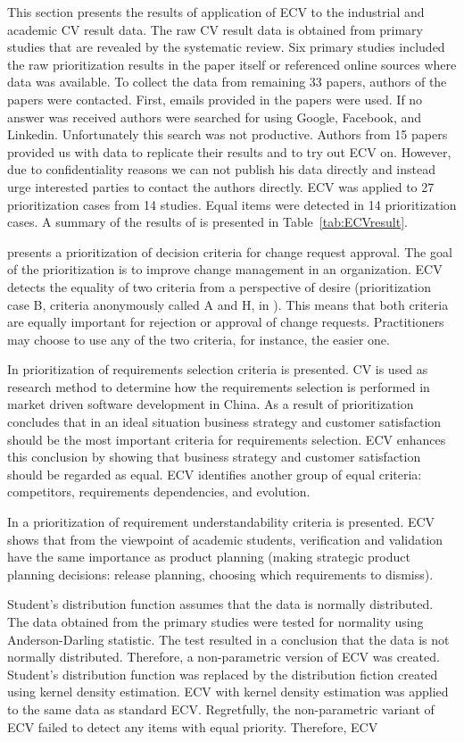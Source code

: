 This section presents the results of application of ECV to the industrial
and academic CV result data. The raw CV result data is obtained from
primary studies that are revealed by the systematic review. Six primary
studies included the raw prioritization results in the paper itself
or referenced online sources where data was available. To collect
the data from remaining 33 papers, authors of the papers were contacted.
First, emails provided in the papers were used. If no answer was received authors
were searched for using Google, Facebook, and Linkedin. Unfortunately
this search was not productive. Authors from 15 papers provided us with data to replicate their results and to try out ECV on.
However, due to confidentiality reasons we can not publish his data directly and instead urge interested parties to contact the authors directly.
ECV was applied to 27 prioritization cases from 14 studies.
Equal items were detected in 14 prioritization cases.
A summary of the results of is presented in Table~\ref{tab:ECVresult}.

\citep{Berander2006a} presents a prioritization of decision criteria
for change request approval. The goal of the prioritization is to
improve change management in an organization. ECV detects the equality
of two criteria from a perspective of desire (prioritization case
B, criteria anonymously called A and H, in \citep{Berander2006a}).
This means that both criteria are equally important for rejection
or approval of change requests. Practitioners may choose to use any
of the two criteria, for instance, the easier one.

In \citep{Hu2006} prioritization of requirements selection criteria
is presented. CV is used as research method to determine how the requirements
selection is performed in market driven software development in China.
As a result of prioritization \citep{Hu2006} concludes that in an
ideal situation business strategy and customer satisfaction should
be the most important criteria for requirements selection. ECV enhances
this conclusion by showing that business strategy and customer satisfaction
should be regarded as equal. ECV identifies another group of equal
criteria: competitors, requirements dependencies, and evolution.

In \citep{Svahnberg2008} a prioritization of requirement understandability
criteria is presented. ECV shows that from the viewpoint of academic
students, verification and validation have the same importance as
product planning (making strategic product planning decisions: release
planning, choosing which requirements to dismiss).

Student's distribution function assumes that the data is normally
distributed. The data obtained from the primary studies were tested
for normality using Anderson-Darling statistic. The test resulted
in a conclusion that the data is not normally distributed. Therefore,
a non-parametric version of ECV was created. Student's distribution
function was replaced by the distribution fiction created using kernel
density estimation. ECV with kernel density estimation was applied
to the same data as standard ECV. Regretfully, the non-parametric
variant of ECV failed to detect any items with equal priority. Therefore,
ECV 
